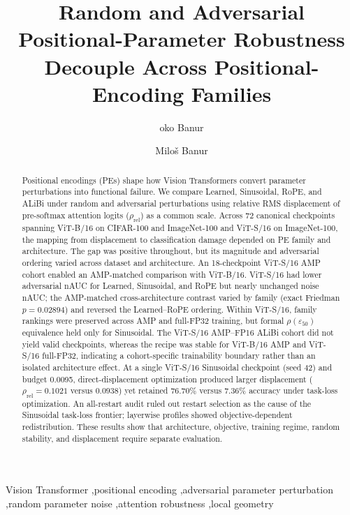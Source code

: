 \documentclass[preprint,12pt,authoryear]{elsarticle}
\begin{document}
\begin{frontmatter}

\title{Random and Adversarial Positional-Parameter Robustness
Decouple Across Positional-Encoding Families}

\author[aff1]{\DJ{}oko Ban{\dj}ur}

\author[aff1]{Milo\v{s} Ban{\dj}ur}


\address[aff1]{
Faculty of Technical Sciences,
University of Priština,
Kosovska Mitrovica, Serbia
}

\begin{abstract}
Positional encodings (PEs) shape how Vision Transformers convert parameter
perturbations into functional failure. We compare Learned, Sinusoidal,
RoPE, and ALiBi under random and adversarial perturbations using relative
RMS displacement of pre-softmax attention logits ($\rho_{\mathrm{rel}}$)
as a common scale. Across 72 canonical checkpoints spanning ViT-B/16 on
CIFAR-100 and ImageNet-100 and ViT-S/16 on ImageNet-100, the mapping from
displacement to classification damage depended on PE family and architecture.
The gap was positive throughout, but its magnitude and adversarial ordering
varied across dataset and architecture. An 18-checkpoint ViT-S/16 AMP cohort
enabled an AMP-matched comparison with ViT-B/16. ViT-S/16 had lower
adversarial nAUC for Learned, Sinusoidal, and RoPE but nearly unchanged noise
nAUC; the AMP-matched cross-architecture contrast varied by family (exact Friedman $p=0.02894$)
and reversed the Learned--RoPE ordering. Within ViT-S/16, family rankings
were preserved across AMP and full-FP32 training, but formal $\rho(\varepsilon_{50})$
equivalence held only for Sinusoidal. The ViT-S/16 AMP--FP16 ALiBi
cohort did not yield valid checkpoints, whereas the recipe was stable for ViT-B/16 AMP and
ViT-S/16 full-FP32, indicating a cohort-specific trainability boundary rather than an isolated architecture effect. At a single ViT-S/16 Sinusoidal checkpoint (seed 42) and budget 0.0095,
direct-displacement optimization produced larger displacement
($\rho_{\mathrm{rel}}=0.1021$ versus $0.0938$) yet retained 76.70\% versus
7.36\% accuracy under task-loss optimization. An all-restart audit ruled
out restart selection as the cause of the Sinusoidal task-loss frontier;
layerwise profiles showed objective-dependent redistribution. These results show that architecture, objective, training regime, random
stability, and displacement require separate evaluation.
\end{abstract}

\begin{keyword}
Vision Transformer
\sep positional encoding
\sep adversarial parameter perturbation
\sep random parameter noise
\sep attention robustness
\sep local geometry
\end{keyword}

\end{frontmatter}
\end{document}
